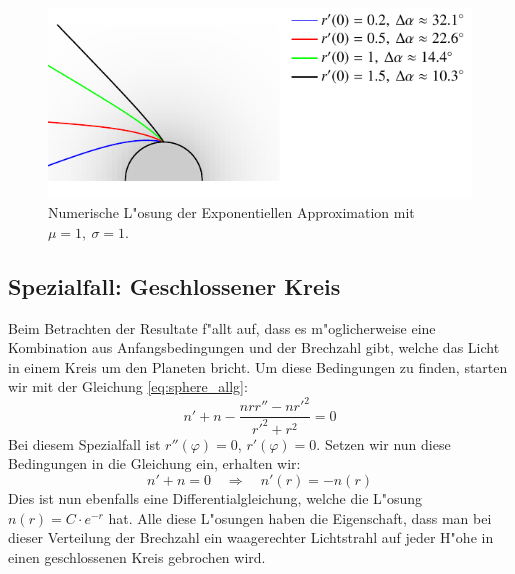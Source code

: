 \begin{refsection}
\begin{figure}
\centering
\includegraphics[scale=1]{licht/standalone/fig_sphere_simulation2.pdf}
\caption{Numerische L"osung der Exponentiellen Approximation mit $\mu = 1, \: \sigma = 1$. \label{fig:sphaerisches_modell3} }
\end{figure}

\newpage

\subsection{Spezialfall: Geschlossener Kreis}
Beim Betrachten der Resultate f"allt auf, dass es m"oglicherweise eine Kombination aus Anfangsbedingungen und der Brechzahl gibt, welche das Licht in einem Kreis um den Planeten bricht. 
Um diese Bedingungen zu finden, starten wir mit der Gleichung \ref{eq:sphere_allg}:
$$ n' + n - \frac{n r r'' - n r'^2}{r'^2 + r^2} = 0$$
Bei diesem Spezialfall ist $r''(\varphi) = 0$, $r'(\varphi) = 0$. 
Setzen wir nun diese Bedingungen in die Gleichung ein, erhalten wir:
$$n' + n = 0 \quad \Rightarrow \quad n'(r) = -n(r)$$
Dies ist nun ebenfalls eine Differentialgleichung, welche die L"osung $n(r) = C \cdot e^{-r}$ hat.
Alle diese L"osungen haben die Eigenschaft, dass man bei dieser Verteilung der Brechzahl ein waagerechter Lichtstrahl auf jeder H"ohe in einen geschlossenen Kreis gebrochen wird.


\end{refsection}
